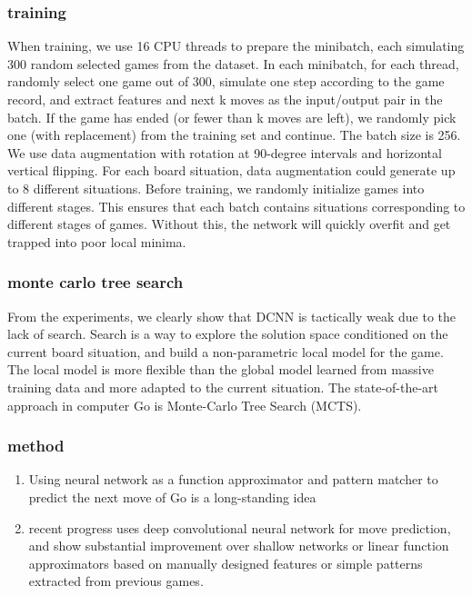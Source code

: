 \subsubsection{training}
When training, we use 16 CPU threads to prepare the minibatch, each simulating 300 random selected
games from the dataset. In each minibatch, for each thread, randomly select one game out of
300, simulate one step according to the game record, and extract features and next k moves as the
input/output pair in the batch. If the game has ended (or fewer than k moves are left), we randomly
pick one (with replacement) from the training set and continue. The batch size is 256. We use data
augmentation with rotation at 90-degree intervals and horizontal vertical flipping. For each board
situation, data augmentation could generate up to 8 different situations.
Before training, we randomly initialize games into different stages. This ensures that each batch
contains situations corresponding to different stages of games. Without this, the network will quickly
overfit and get trapped into poor local minima.
\subsubsection{monte carlo tree search}
From the experiments, we clearly show that DCNN is tactically weak due to the lack of search.
Search is a way to explore the solution space conditioned on the current board situation, and build
a non-parametric local model for the game. The local model is more flexible than the global model
learned from massive training data and more adapted to the current situation. The state-of-the-art
approach in computer Go is Monte-Carlo Tree Search (MCTS).
\subsubsection{method}
\begin{enumerate}
	\item Using neural network as a function approximator and pattern matcher to predict the next move of Go is a long-standing idea
	\item recent progress uses deep convolutional neural network for move prediction, and show substantial improvement over shallow networks or linear function approximators based on manually designed features or simple patterns extracted from previous games.
\end{enumerate}

